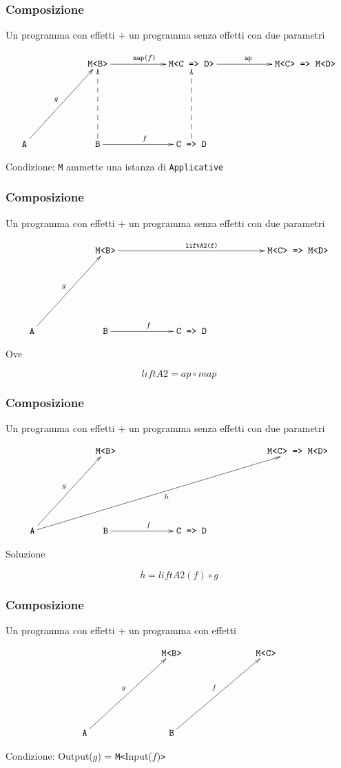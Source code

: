 \documentclass{beamer}
\begin{document}
\begin{frame}
\frametitle{Composizione}

Un programma con effetti + un programma senza effetti con due parametri

\[
\xymatrixrowsep{2.5cm}
\xymatrixcolsep{2cm}
\xymatrix{
  & \texttt{M<B>} \ar[r]^{\texttt{map(}f\texttt{)}} & \texttt{M<C => D>} \ar[r]^{\texttt{ap}} & \texttt{M<C> => M<D>} \\
  \texttt{A} \ar[ur]^{g} & \texttt{B} \ar[r]^{f} \ar@{-->}[u]  & \texttt{C => D} \ar@{-->}[u]
}
\]

Condizione: \texttt{M} ammette una istanza di \texttt{Applicative}

\end{frame}

\begin{frame}
\frametitle{Composizione}

Un programma con effetti + un programma senza effetti con due parametri

\[
\xymatrixrowsep{2.5cm}
\xymatrixcolsep{2cm}
\xymatrix{
  & \texttt{M<B>} \ar[rr]^{\texttt{liftA2(f)}} & & \texttt{M<C> => M<D>} \\
  \texttt{A} \ar[ur]^{g} & \texttt{B} \ar[r]^{f} & \texttt{C => D}
}
\]

Ove

$$
liftA2 = ap \circ map
$$

\end{frame}

\begin{frame}
\frametitle{Composizione}

Un programma con effetti + un programma senza effetti con due parametri

\[
\xymatrixrowsep{2.5cm}
\xymatrixcolsep{2cm}
\xymatrix{
  & \texttt{M<B>} & &  \texttt{M<C> => M<D>} \\
  \texttt{A} \ar[ur]^{g} \ar[urrr]_{h} & \texttt{B} \ar[r]^{f} & \texttt{C => D}
}
\]

Soluzione

$$
h = liftA2(f) \circ g
$$

\end{frame}

\begin{frame}
\frametitle{Composizione}

Un programma con effetti + un programma con effetti

\[
\xymatrixrowsep{2.5cm}
\xymatrixcolsep{2.5cm}
\xymatrix{
  & \texttt{M<B>} & \texttt{M<C>} \\
  \texttt{A} \ar[ur]^{g} & \texttt{B} \ar[ur]^{f}
}
\]

Condizione: Output($g$) = \texttt{M<}Input($f$)\texttt{>}

\end{frame}
\end{document}
